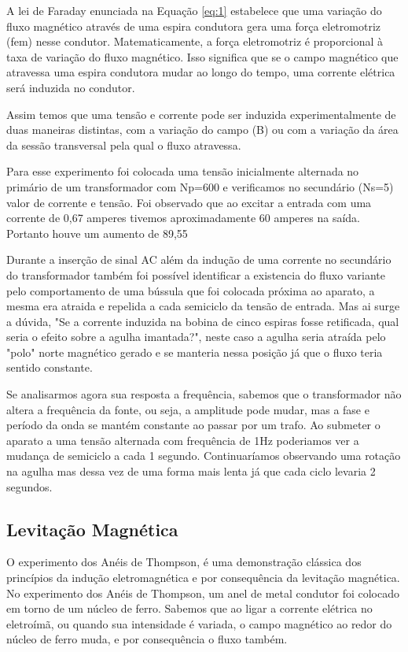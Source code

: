 \documentclass[12pt, a4paper, notitlepage]{article}
\begin{document}
        A lei de Faraday enunciada na Equação \ref{eq:1} estabelece que uma variação do fluxo magnético através de uma espira condutora gera uma força eletromotriz (fem) nesse condutor. Matematicamente, a força eletromotriz é proporcional à taxa de variação do fluxo magnético. Isso significa que se o campo magnético que atravessa uma espira condutora mudar ao longo do tempo, uma corrente elétrica será induzida no condutor.
        
        Assim temos que uma tensão e corrente pode ser induzida experimentalmente de duas maneiras distintas, com a variação do campo (B) ou com a variação da área da sessão transversal pela qual o fluxo atravessa.
        
        Para esse experimento foi colocada uma tensão inicialmente alternada no primário de um transformador com Np=600 e verificamos no secundário (Ns=5) valor de corrente e tensão. Foi observado que ao excitar a entrada com uma corrente de 0,67 amperes tivemos aproximadamente 60 amperes na saída. Portanto houve um aumento de 89,55%
       
        Durante a inserção de sinal AC além da indução de uma corrente no secundário do transformador também foi possível identificar a existencia do fluxo variante pelo comportamento de uma bússula que foi colocada próxima ao aparato, a mesma era atraida e repelida a cada semiciclo da tensão de entrada. Mas ai surge a dúvida, "Se a corrente induzida na bobina de cinco espiras fosse retificada, qual seria o efeito sobre a agulha imantada?", neste caso a agulha seria atraída pelo "polo" norte magnético gerado e se manteria nessa posição já que o fluxo teria sentido constante.
      
        Se analisarmos agora sua resposta a frequência, sabemos que o transformador não altera a frequência da fonte, ou seja, a amplitude pode mudar, mas a fase e período da onda se mantém constante ao passar por um trafo. Ao submeter o aparato a uma tensão alternada com frequência de 1Hz poderiamos ver a mudança de semiciclo a cada 1 segundo. Continuaríamos observando uma rotação na agulha mas dessa vez de uma forma mais lenta já que cada ciclo levaria 2 segundos.
        
 \subsection{Levitação Magnética}

O experimento dos Anéis de Thompson, é uma demonstração clássica dos princípios da indução eletromagnética e por consequência da levitação magnética. No experimento dos Anéis de Thompson, um anel de metal condutor foi colocado em torno de um núcleo de ferro. Sabemos que ao ligar a corrente elétrica no eletroímã, ou quando sua intensidade é variada, o campo magnético ao redor do núcleo de ferro muda, e por consequência o fluxo também.
\end{document}
